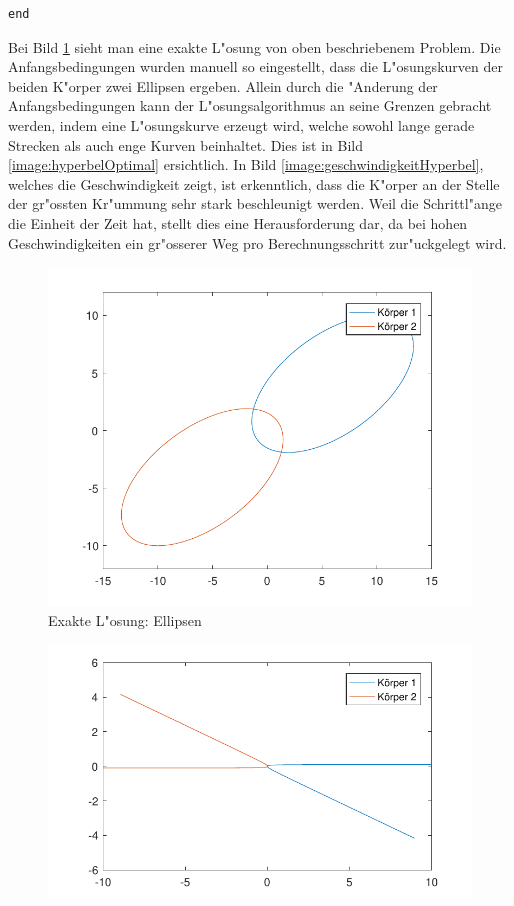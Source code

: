 \begin{refsection}
\begin{lstlisting}[style=Matlab, caption={Problemfunktion}, captionpos=b, label={code:planets}]
end
\end{lstlisting}
Bei Bild \ref{image:ellipseOptimal} sieht man eine exakte L"osung von oben beschriebenem Problem.
Die Anfangsbedingungen wurden manuell so eingestellt, dass die L"osungskurven der beiden K"orper zwei Ellipsen ergeben.
Allein durch die "Anderung der Anfangsbedingungen kann der L"osungsalgorithmus an seine Grenzen gebracht werden, indem eine L"osungskurve erzeugt wird, welche sowohl lange gerade Strecken als auch enge Kurven beinhaltet.
Dies ist in Bild \ref{image:hyperbelOptimal} ersichtlich.
In Bild \ref{image:geschwindigkeitHyperbel}, welches die Geschwindigkeit zeigt, ist erkenntlich, dass die K"orper an der Stelle der gr"ossten Kr"ummung sehr stark beschleunigt werden.
Weil die Schrittl"ange die Einheit der Zeit hat, stellt dies eine Herausforderung dar, da bei hohen Geschwindigkeiten ein gr"osserer Weg pro Berechnungsschritt zur"uckgelegt wird.
\begin{figure}
\centering
\includegraphics{schrittlaenge/images/ellipseOptimal.pdf}
\caption{Exakte L"osung: Ellipsen}
\label{image:ellipseOptimal}
\end{figure}
\begin{figure}
\centering
\includegraphics{schrittlaenge/images/hyperbelOptimal.pdf}

\end{figure}
\end{refsection}
